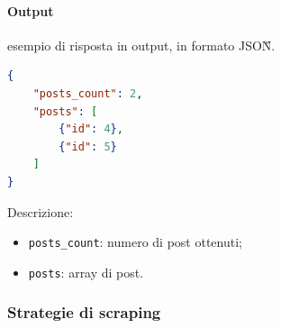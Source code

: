 \paragraph*{Output} esempio di risposta in output, in formato JSON\G{}.
\begin{lstlisting}[language=JSON]
{
    "posts_count": 2,
    "posts": [
        {"id": 4},
        {"id": 5}
    ]
}
\end{lstlisting}
Descrizione:
\begin{itemize}
    \item \verb|posts_count|: numero di post ottenuti;
    \item \verb|posts|: array di post. 
\end{itemize}

\subsubsection{Strategie di scraping}
